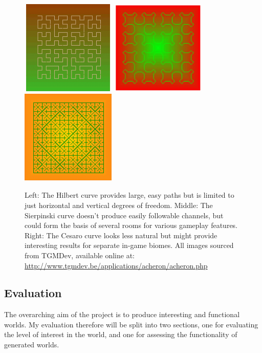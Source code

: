\documentclass[12pt,a4paper]{article}
\begin{document}
\begin{figure}
\centering
	\includegraphics[width=4.5cm,height=4.5cm]{images/hilbert.png}
	\includegraphics[width=4.5cm,height=4.5cm]{images/sierpinskicrv.png}
	\includegraphics[width=4.5cm,height=4.5cm]{images/cesaro.png}
	\caption[]{Left: The Hilbert curve provides large, easy paths but is limited to just horizontal and vertical degrees of freedom. Middle: The Sierpinski curve doesn't produce easily followable channels, but could form the basis of several rooms for various gameplay features. Right: The Cesaro curve looks less natural but might provide interesting results for separate in-game biomes. All images sourced from TGMDev, available online at: \url{http://www.tgmdev.be/applications/acheron/acheron.php}	}
	\label{fig:fig9}
\end{figure}


\subsection{Evaluation}

The overarching aim of the project is to produce interesting and functional worlds. My evaluation therefore will be split into two sections, one for evaluating the level of interest in the world, and one for assessing the functionality of generated worlds. \\
\end{document}
